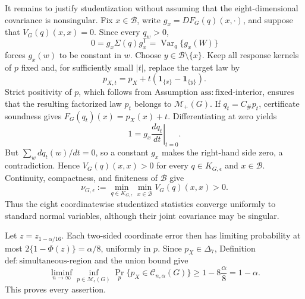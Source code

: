 It remains to justify studentization without assuming that the eight-dimensional covariance is nonsingular. Fix \(x\in\mathcal B\), write \(g_x=D F_G(q)(x,\cdot)\), and suppose that \(V_G(q)(x,x)=0\). Since every \(q_w>0\),
\[
0=g_x\Sigma(q)g_x^{\mathsf T}=\operatorname{Var}_q\{g_x(W)\}
\]
forces \(g_x(w)\) to be constant in \(w\). Choose \(y\in\mathcal B\setminus\{x\}\). Keep all response kernels of \(p\) fixed and, for sufficiently small \(|t|\), replace the target law by
\[
p_{X,t}=p_X+t(\mathbf 1_{\{x\}}-\mathbf 1_{\{y\}}).
\]
Strict positivity of \(p\), which follows from Assumption \(\mathrm{ass{:}fixed\text{-}interior}\), ensures that the resulting factorized law \(p_t\) belongs to \(\mathcal M_+(G)\). If \(q_t=C_\#p_t\), certificate soundness gives \(F_G(q_t)(x)=p_X(x)+t\). Differentiating at zero yields
\[
1=g_x\left.\frac{d q_t}{dt}\right|_{t=0}.
\]
But \(\sum_w d q_t(w)/dt=0\), so a constant \(g_x\) makes the right-hand side zero, a contradiction. Hence \(V_G(q)(x,x)>0\) for every \(q\in K_{G,\epsilon}\) and \(x\in\mathcal B\). Continuity, compactness, and finiteness of \(\mathcal B\) give
\[
\nu_{G,\epsilon}:=\min_{q\in K_{G,\epsilon}}\min_{x\in\mathcal B}V_G(q)(x,x)>0.
\]
Thus the eight coordinatewise studentized statistics converge uniformly to standard normal variables, although their joint covariance may be singular.

Let \(z=z_{1-\alpha/16}\). Each two-sided coordinate error then has limiting probability at most \(2\{1-\Phi(z)\}=\alpha/8\), uniformly in \(p\). Since \(p_X\in\Delta_7\), Definition \(\mathrm{def{:}simultaneous\text{-}region}\) and the union bound give
\[
\liminf_{n\to\infty}\inf_{p\in\mathcal M_\epsilon(G)}
\Pr_p\{p_X\in\mathcal C_{n,\alpha}(G)\}
\geq1-8\frac{\alpha}{8}=1-\alpha.
\]
This proves every assertion.